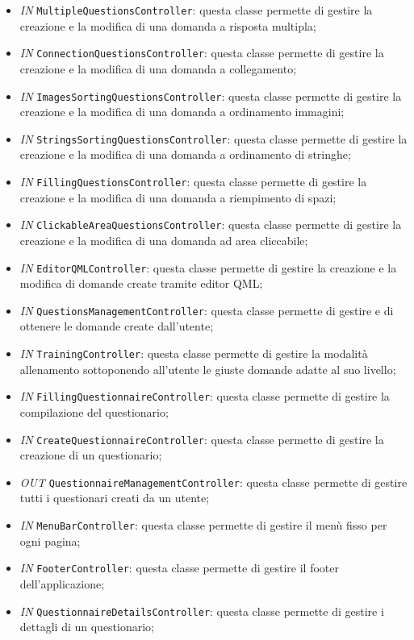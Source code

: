 \begin{itemize}
\begin{itemize}
		\item \textit{IN} \texttt{MultipleQuestionsController}: questa classe permette di gestire la creazione e la modifica di una domanda a risposta multipla;
		\item \textit{IN} \texttt{ConnectionQuestionsController}: questa classe permette di gestire la creazione e la modifica di una domanda a collegamento;
		\item \textit{IN} \texttt{ImagesSortingQuestionsController}: questa classe permette di gestire la creazione e la modifica di una domanda a ordinamento immagini;
		\item \textit{IN} \texttt{StringsSortingQuestionsController}: questa classe permette di gestire la creazione e la modifica di una domanda a ordinamento di stringhe;
		\item \textit{IN} \texttt{FillingQuestionsController}: questa classe permette di gestire la creazione e la modifica di una domanda a riempimento di spazi; 
		\item \textit{IN} \texttt{ClickableAreaQuestionsController}: questa classe permette di gestire la creazione e la modifica di una domanda ad area cliccabile;
		\item \textit{IN} \texttt{EditorQMLController}: questa classe permette di gestire la creazione e la modifica di domande create tramite editor QML;
		\item \textit{IN} \texttt{QuestionsManagementController}: questa classe permette di gestire e di ottenere le domande create dall'utente;
		\item \textit{IN} \texttt{TrainingController}: questa classe permette di gestire la modalità allenamento sottoponendo all'utente le giuste domande adatte al suo livello;
		\item \textit{IN} \texttt{FillingQuestionnaireController}: questa classe permette di gestire la compilazione del questionario;
		\item \textit{IN} \texttt{CreateQuestionnaireController}: questa classe permette di gestire la creazione di un questionario;
		\item \textit{OUT} \texttt{QuestionnaireManagementController}: questa classe permette di gestire tutti i questionari creati da un utente;
		\item \textit{IN} \texttt{MenuBarController}: questa classe permette di gestire il menù fisso per ogni pagina;
		\item \textit{IN} \texttt{FooterController}: questa classe permette di gestire il footer dell'applicazione;
		\item \textit{IN} \texttt{QuestionnaireDetailsController}: questa classe permette di gestire i dettagli di un questionario;

\end{itemize}
\end{itemize}
